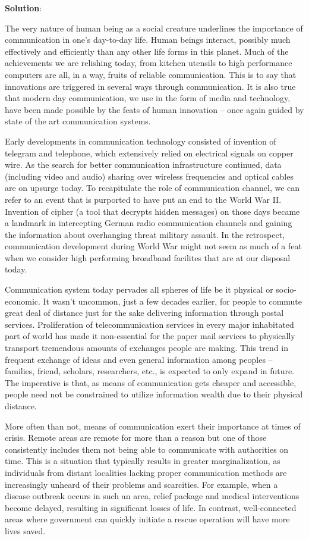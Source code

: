 \documentclass[
  openany]{book}
\newenvironment{solution}{ {\bfseries Solution}:}{}
\begin{document}
\begin{solution}

The very nature of human being as a social creature underlines the importance of communication in one's day-to-day life. Human beings interact, possibly much effectively and efficiently than any other life forms in this planet. Much of the achievements we are relishing today, from kitchen utensils to high performance computers are all, in a way, fruits of reliable communication. This is to say that innovations are triggered in several ways through communication. It is also true that modern day communication, we use in the form of media and technology, have been made possible by the feats of human innovation -- once again guided by state of the art communication systems.

Early developments in communication technology consisted of invention of telegram and telephone, which extensively relied on electrical signals on copper wire. As the search for better communication infrastructure continued, data (including video and audio) sharing over wireless frequencies and optical cables are on upsurge today. To recapitulate the role of communication channel, we can refer to an event that is purported to have put an end to the World War II. Invention of cipher (a tool that decrypts hidden messages) on those days became a landmark in intercepting German radio communication channels and gaining the information about overhanging threat military assault. In the retrospect, communication development during World War might not seem as much of a feat when we consider high performing broadband facilites that are at our disposal today.

Communication system today pervades all spheres of life be it physical or socio-economic. It wasn't uncommon, just a few decades earlier, for people to commute great deal of distance just for the sake delivering information through postal services. Proliferation of telecommunication services in every major inhabitated part of world has made it non-essential for the paper mail services to physically transport tremendous amounts of exchanges people are making. This trend in frequent exchange of ideas and even general information among peoples -- families, friend, scholars, researchers, etc., is expected to only expand in future. The imperative is that, as means of communication gets cheaper and accessible, people need not be constrained to utilize information wealth due to their physical distance.

More often than not, means of communication exert their importance at times of crisis. Remote areas are remote for more than a reason but one of those consistently includes them not being able to communicate with authorities on time. This is a situation that typically results in greater marginalization, as individuals from distant localities lacking proper communication methods are increasingly unheard of their problems and scarcities. For example, when a disease outbreak occurs in such an area, relief package and medical interventions become delayed, resulting in significant losses of life. In contrast, well-connected areas where government can quickly initiate a rescue operation will have more lives saved.


\end{solution}
\end{document}
